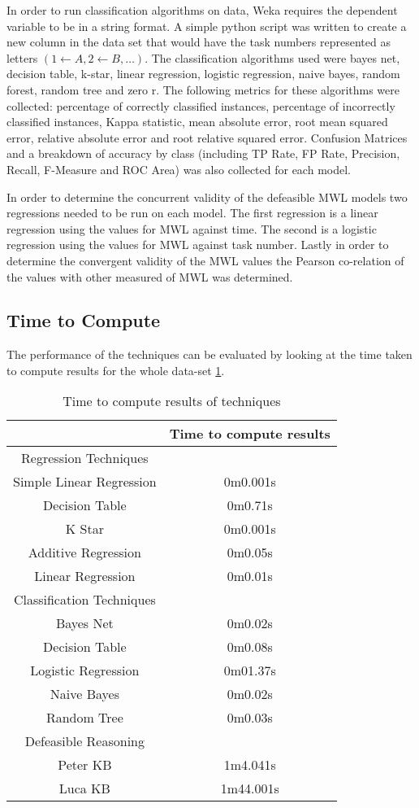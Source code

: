 In order to run classification algorithms on data, Weka requires the dependent variable to be in a string format. A simple python script was written to create a new column in the data set that would have the task numbers represented as letters $(1 \leftarrow A, 2 \leftarrow B, \ldots)$.
The classification algorithms used were bayes net, decision table, k-star, linear regression, logistic regression, naive bayes, random forest, random tree and zero r. The following metrics for these algorithms were collected: percentage of correctly classified instances, percentage of incorrectly classified instances, Kappa statistic, mean absolute error, root mean squared error, relative absolute error and root relative squared error. Confusion Matrices and a breakdown of accuracy by class (including TP Rate, FP Rate, Precision, Recall, F-Measure and ROC Area) was also collected for each model.

In order to determine the concurrent validity of the defeasible MWL models two regressions needed to be run on each model. The first regression is a linear regression using the values for MWL against time. The second is a logistic regression using the values for MWL against task number. Lastly in order to determine the convergent validity of the MWL values the Pearson co-relation of the values with other measured of MWL was determined.

\subsection{Time to Compute}

The performance of the techniques can be evaluated by looking at the time taken to compute results for the whole data-set \ref{tab:timeperformance}.

\begin{table}[!htbp]
\centering
\begin{tabular}{|c|c|}
\hline
 & Time to compute results \\ \hline
Regression Techniques & \\ \hline
Simple Linear Regression & 0m0.001s\\
Decision Table & 0m0.71s\\
K Star & 0m0.001s\\
Additive Regression & 0m0.05s\\
Linear Regression & 0m0.01s\\ \hline
Classification Techniques & \\ \hline
Bayes Net &0m0.02s \\
Decision Table & 0m0.08s\\  
Logistic Regression & 0m01.37s\\ 
Naive Bayes & 0m0.02s\\ 
Random Tree & 0m0.03s\\ \hline
Defeasible Reasoning & \\ \hline
Peter KB & 1m4.041s\\
Luca KB & 1m44.001s\\
\hline
\end{tabular}
\caption{Time to compute results of techniques}
\label{tab:timeperformance}
\end{table}

